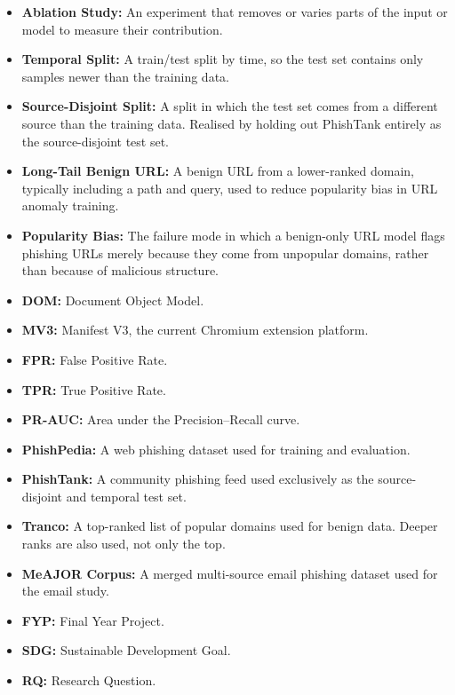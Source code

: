 \documentclass{FastFyp}
\begin{document}
\begin{itemize}
    \item \textbf{Ablation Study:} An experiment that removes or varies parts of the input or model to measure their contribution.
    \item \textbf{Temporal Split:} A train/test split by time, so the test set contains only samples newer than the training data.
    \item \textbf{Source-Disjoint Split:} A split in which the test set comes from a different source than the training data. Realised by holding out PhishTank entirely as the source-disjoint test set.
    \item \textbf{Long-Tail Benign URL:} A benign URL from a lower-ranked domain, typically including a path and query, used to reduce popularity bias in URL anomaly training.
    \item \textbf{Popularity Bias:} The failure mode in which a benign-only URL model flags phishing URLs merely because they come from unpopular domains, rather than because of malicious structure.
    \item \textbf{DOM:} Document Object Model.
    \item \textbf{MV3:} Manifest V3, the current Chromium extension platform.
    \item \textbf{FPR:} False Positive Rate.
    \item \textbf{TPR:} True Positive Rate.
    \item \textbf{PR-AUC:} Area under the Precision--Recall curve.
    \item \textbf{PhishPedia:} A web phishing dataset used for training and evaluation. 
    \item \textbf{PhishTank:} A community phishing feed used exclusively as the source-disjoint and temporal test set. 
\item \textbf{Tranco:} A top-ranked list of popular domains used for benign data. Deeper ranks are also used, not only the top.
    \item \textbf{MeAJOR Corpus:} A merged multi-source email phishing dataset used for the email study.
    \item \textbf{FYP:} Final Year Project.
    \item \textbf{SDG:} Sustainable Development Goal.
    \item \textbf{RQ:} Research Question.
\end{itemize}
\end{document}
